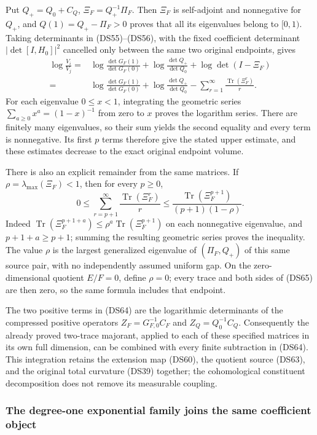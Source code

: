 Put $Q_+=Q_0+C_Q$, $\Xi_F=Q_+^{-1}\Pi_F$.  Then $\Xi_F$ is
self-adjoint and nonnegative for $Q_+$, and
$Q(1)=Q_+-\Pi_F>0$ proves that all its eigenvalues belong to
$[0,1)$.  Taking determinants in (DS55)--(DS56), with the fixed
coefficient determinant $|\det[I,H_0]|^2$ cancelled only between
the same two original endpoints, gives
\[
\begin{split}
 \log\frac{V_i}{V_j}
 ={}&\log\frac{\det G_F(1)}{\det G_F(0)}
   +\log\frac{\det Q_+}{\det Q_0}
   +\log\det(I-\Xi_F)\\
 ={}&\log\frac{\det G_F(1)}{\det G_F(0)}
   +\log\frac{\det Q_+}{\det Q_0}
   -\sum_{r=1}^\infty\frac{\operatorname{Tr}(\Xi_F^r)}r.
\end{split}\tag{DS64}
\]
For each eigenvalue $0\leq x<1$, integrating the geometric series
$\sum_{a\geq0}x^a=(1-x)^{-1}$ from zero to $x$ proves the
logarithm series.  There are finitely many eigenvalues, so their
sum yields the second equality and every term is nonnegative.
Its first $p$ terms therefore give the stated upper estimate, and
these estimates decrease to the exact original endpoint volume.

There is also an explicit remainder from the same matrices.  If
$\rho=\lambda_{\max}(\Xi_F)<1$, then for every $p\geq0$,
\[
 0\leq
 \sum_{r=p+1}^\infty\frac{\operatorname{Tr}(\Xi_F^r)}r
 \leq\frac{\operatorname{Tr}(\Xi_F^{p+1})}{(p+1)(1-\rho)}.
 \tag{DS65}
\]
Indeed $\operatorname{Tr}(\Xi_F^{p+1+a})
\leq\rho^a\operatorname{Tr}(\Xi_F^{p+1})$ on each nonnegative
eigenvalue, and $p+1+a\geq p+1$; summing the resulting geometric
series proves the inequality.  The value $\rho$ is the largest
generalized eigenvalue of $(\Pi_F,Q_+)$ of this same source pair,
with no independently assumed uniform gap.  On the zero-dimensional
quotient $E/F=0$, define $\rho=0$; every trace and both sides of
(DS65) are then zero, so the same formula includes that endpoint.

The two positive terms in (DS64) are the logarithmic determinants
of the compressed positive operators
$Z_F=G_{F,0}^{-1}C_F$ and $Z_Q=Q_0^{-1}C_Q$.
Consequently the already proved two-trace majorant, applied to
each of these specified matrices in its own full dimension, can
be combined with every finite subtraction in (DS64).  This
integration retains the extension map (DS60), the quotient source
(DS63), and the original total curvature (DS39) together; the
cohomological constituent decomposition does not remove its
measurable coupling.

\subsubsection{The degree-one exponential family joins the same coefficient object}

